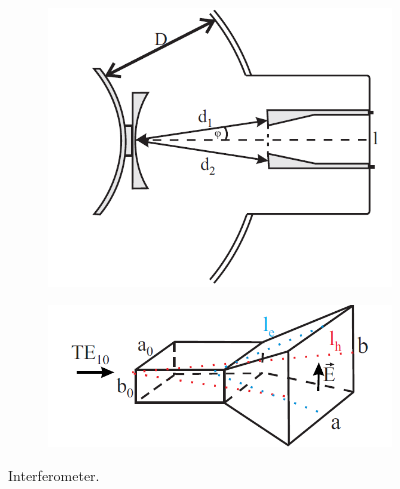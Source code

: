 \begin{figure}[H]
    \centering
    \begin{subfigure}{0.4\textwidth}
        \centering
        \includegraphics[width=1\textwidth]{sections/imges/ports/interferometer.png}
        \label{fig:interferometer_setup}
    \end{subfigure}
    \hfill
    \begin{subfigure}{0.59\textwidth}
        \centering
        \includegraphics[width=1\textwidth]{sections/imges/ports/interferometer_horn_antena.png}
        \label{fig:horn_antena_interferometer}
    \end{subfigure}
    \caption{Interferometer.}
    \label{fig:interferometer}
\end{figure}



